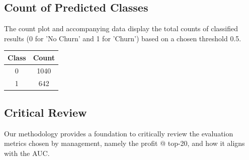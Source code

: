 \documentclass{article}
\begin{document}
\subsection{ Count of Predicted Classes}
The count plot and accompanying data display the total counts of classified results (0 for 'No Churn' and 1 for 'Churn') based on a chosen threshold 0.5.

\begin{center}
\begin{tabular}{|c|c|}
\hline
\textbf{Class} & \textbf{Count} \\
\hline
0 & 1040 \\
\hline
1 & 642 \\
\hline
\end{tabular}
\end{center}

\subsection{ Critical Review}

Our methodology provides a foundation to critically review the evaluation metrics chosen by management, namely the profit @ top-20, and how it aligns with the AUC.
\end{document}
